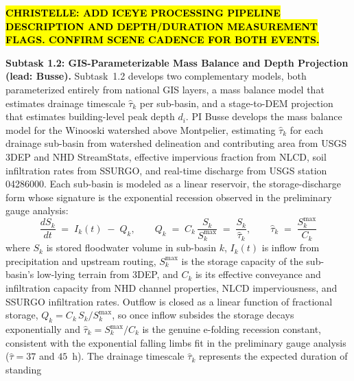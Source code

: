 \documentclass[11pt]{article}
\begin{document}
\hl{\textbf{CHRISTELLE: ADD ICEYE PROCESSING PIPELINE DESCRIPTION AND DEPTH/DURATION MEASUREMENT FLAGS. CONFIRM SCENE CADENCE FOR BOTH EVENTS.}}

\textbf{Subtask 1.2: GIS-Parameterizable Mass Balance and Depth Projection (lead: Busse).}
Subtask~1.2 develops two complementary models, both parameterized entirely from
national GIS layers, a mass balance model that estimates drainage timescale
$\hat{\tau}_k$ per sub-basin, and a stage-to-DEM projection that estimates
building-level peak depth $d_i$.
PI Busse develops the mass balance model for the Winooski watershed above
Montpelier, estimating $\hat{\tau}_k$ for each drainage sub-basin from watershed delineation and contributing
area from USGS 3DEP and NHD StreamStats, effective impervious fraction from NLCD,
soil infiltration rates from SSURGO, and real-time discharge from USGS station
04286000.
Each sub-basin is modeled as a linear reservoir, the storage-discharge form whose
signature is the exponential recession observed in the preliminary gauge analysis:
\begin{equation}\label{eq:tau}
  \frac{dS_k}{dt} \;=\; I_k(t) \;-\; Q_k,
  \qquad
  Q_k \;=\; C_k\,\frac{S_k}{S_k^{\mathrm{max}}} \;=\; \frac{S_k}{\hat{\tau}_k},
  \qquad
  \hat{\tau}_k \;=\; \frac{S_k^{\mathrm{max}}}{C_k}
\end{equation}
where $S_k$ is stored floodwater volume in sub-basin $k$, $I_k(t)$ is inflow from
precipitation and upstream routing, $S_k^{\mathrm{max}}$ is the storage capacity
of the sub-basin's low-lying terrain from 3DEP, and $C_k$ is its effective
conveyance and infiltration capacity from NHD channel properties, NLCD
imperviousness, and SSURGO infiltration rates. Outflow is closed as a linear
function of fractional storage, $Q_k = C_k\,S_k/S_k^{\mathrm{max}}$, so once
inflow subsides the storage decays exponentially and $\hat{\tau}_k =
S_k^{\mathrm{max}}/C_k$ is the genuine e-folding recession constant, consistent
with the exponential falling limbs fit in the preliminary gauge analysis
($\hat{\tau} = 37$ and $45$~h).
The drainage timescale $\hat{\tau}_k$ represents the expected duration of standing
\end{document}
